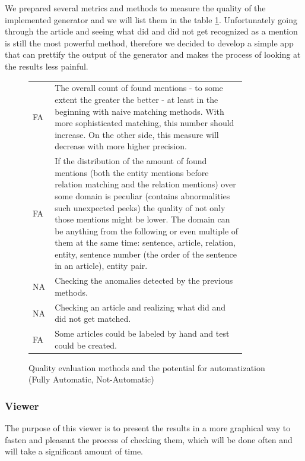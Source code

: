 We prepared several metrics and methods to measure the quality of the implemented generator and we will list them in the table \ref{tab:qualityEval}. Unfortunately going through the article and seeing what did and did not get recognized as a mention is still the most powerful method, therefore we decided to develop a simple app that can prettify the output of the generator and makes the process of looking at the results less painful.  

\begin{figure}

\begin{tabular}{p{0.05\linewidth}p{0.8\linewidth}}

FA & The overall count of found mentions - to some extent the greater the better - at least in the beginning with naive matching methods. With more sophisticated matching, this number should increase. On the other side, this measure will decrease with more higher precision. \\ 
FA & If the distribution of the amount of found mentions (both the entity mentions before relation matching and the relation mentions) over some domain is peculiar (contains abnormalities such unexpected peeks) the quality of not only those mentions might be lower. The domain can be anything from the following or even multiple of them at the same time:
sentence, article, relation, entity, sentence number (the order of the sentence in an article), entity pair. \\ 
NA & Checking the anomalies detected by the previous methods.  \\ 
NA & Checking an article and realizing what did and did not get matched. \\ 
FA & Some articles could be labeled by hand and test could be created.\\

\end{tabular} 

\caption{Quality evaluation methods and the potential for automatization (Fully Automatic, Not-Automatic)}
\label{tab:qualityEval}
\end{figure}


\subsubsection{Viewer}
The purpose of this viewer is to present the results in a more graphical way to fasten and pleasant the process of checking them, which will be done often and will take a significant amount of time.

